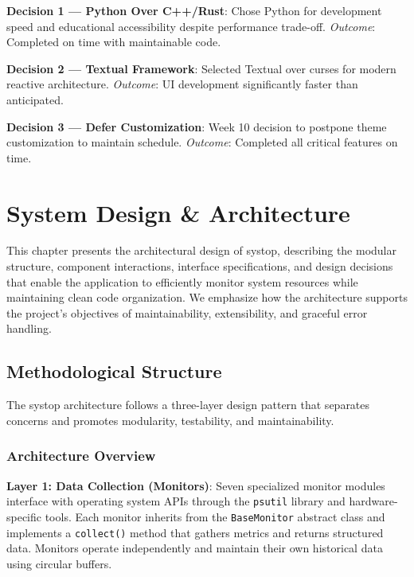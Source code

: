\documentclass[12pt,a4paper,oneside]{report}
\begin{document}
\textbf{Decision 1 --- Python Over C++/Rust}: Chose Python for development speed and educational accessibility despite performance trade-off. \textit{Outcome}: Completed on time with maintainable code.

\textbf{Decision 2 --- Textual Framework}: Selected Textual over curses for modern reactive architecture. \textit{Outcome}: UI development significantly faster than anticipated.

\textbf{Decision 3 --- Defer Customization}: Week 10 decision to postpone theme customization to maintain schedule. \textit{Outcome}: Completed all critical features on time.

\chapter{System Design \& Architecture}
\label{chap:design}

This chapter presents the architectural design of systop, describing the modular structure, component interactions, interface specifications, and design decisions that enable the application to efficiently monitor system resources while maintaining clean code organization. We emphasize how the architecture supports the project's objectives of maintainability, extensibility, and graceful error handling.

\section{Methodological Structure}
\label{sec:methodological-structure}

The systop architecture follows a three-layer design pattern that separates concerns and promotes modularity, testability, and maintainability.

\subsection{Architecture Overview}

\textbf{Layer 1: Data Collection (Monitors)}: Seven specialized monitor modules interface with operating system APIs through the \texttt{psutil} library and hardware-specific tools. Each monitor inherits from the \texttt{BaseMonitor} abstract class and implements a \texttt{collect()} method that gathers metrics and returns structured data. Monitors operate independently and maintain their own historical data using circular buffers.
\end{document}
